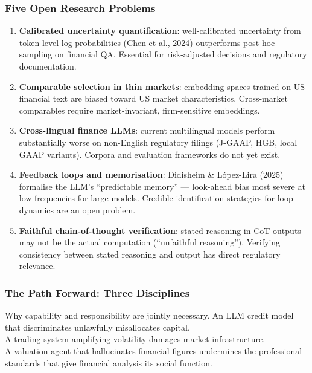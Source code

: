 \documentclass[9pt,t]{beamer}
\begin{document}
\begin{frame}
\frametitle{Five Open Research Problems}

\begin{enumerate}
  \item \textbf{Calibrated uncertainty quantification}: well-calibrated uncertainty from token-level log-probabilities (Chen et al., 2024) outperforms post-hoc sampling on financial QA. Essential for risk-adjusted decisions and regulatory documentation.

  \item \textbf{Comparable selection in thin markets}: embedding spaces trained on US financial text are biased toward US market characteristics. Cross-market comparables require market-invariant, firm-sensitive embeddings.

  \item \textbf{Cross-lingual finance LLMs}: current multilingual models perform substantially worse on non-English regulatory filings (J-GAAP, HGB, local GAAP variants). Corpora and evaluation frameworks do not yet exist.

  \item \textbf{Feedback loops and memorisation}: Didisheim \& L\'{o}pez-Lira (2025) formalise the LLM's ``predictable memory'' --- look-ahead bias most severe at low frequencies for large models. Credible identification strategies for loop dynamics are an open problem.

  \item \textbf{Faithful chain-of-thought verification}: stated reasoning in CoT outputs may not be the actual computation (``unfaithful reasoning''). Verifying consistency between stated reasoning and output has direct regulatory relevance.
\end{enumerate}
\end{frame}

\begin{frame}
\frametitle{The Path Forward: Three Disciplines}

\begin{bigpicture}
  Why capability and responsibility are jointly necessary.
  An LLM credit model that discriminates unlawfully misallocates capital.\\
  A trading system amplifying volatility damages market infrastructure.\\
  A valuation agent that hallucinates financial figures undermines the professional
  standards that give financial analysis its social function.
\end{bigpicture}
\end{frame}
\end{document}
